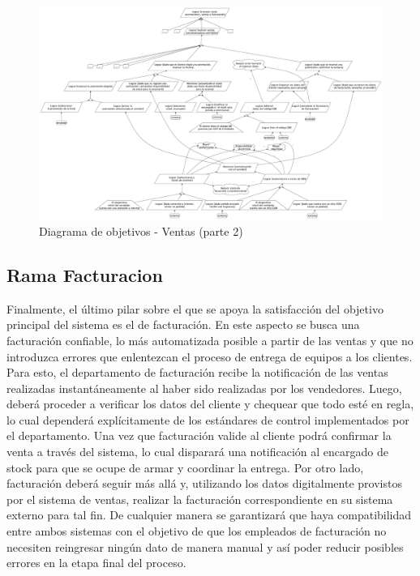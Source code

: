 \clearpage

\clearpage

\begin{figure}[h!]
  \centering
  \includegraphics[width=1.5\textwidth, angle=90]{./imagenes/ventas_2.pdf}
  \caption{Diagrama de objetivos - Ventas (parte 2)}
\end{figure}

\clearpage

\subsection{Rama Facturacion}

Finalmente, el último pilar sobre el que se apoya la satisfacción del objetivo principal del sistema es el de facturación. En este aspecto se busca una facturación confiable, lo más automatizada posible a partir de las ventas y que no introduzca errores que enlentezcan el proceso de entrega de equipos a los clientes. Para esto, el departamento de facturación recibe la notificación de las ventas realizadas instantáneamente al haber sido realizadas por los vendedores. Luego, deberá proceder a verificar los datos del cliente y chequear que todo esté en regla, lo cual dependerá explícitamente de los estándares de control implementados por el departamento. Una vez que facturación valide al cliente podrá confirmar la venta a través del sistema, lo cual disparará una notificación al encargado de stock para que se ocupe de armar y coordinar la entrega. Por otro lado, facturación deberá seguir más allá y, utilizando los datos digitalmente provistos por el sistema de ventas, realizar la facturación correspondiente en su sistema externo para tal fin. De cualquier manera se garantizará que haya compatibilidad entre ambos sistemas con el objetivo de que los empleados de facturación no necesiten reingresar ningún dato de manera manual y así poder reducir posibles errores en la etapa final del proceso.

